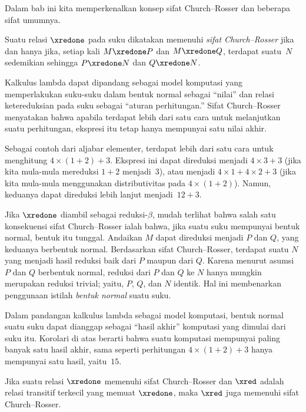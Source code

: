 \documentclass[../../../include/open-logic-section]{subfiles}
\begin{document}


Dalam bab ini kita memperkenalkan konsep sifat Church--Rosser dan beberapa
sifat umumnya.

\begin{defn} Suatu relasi $\xredone$ pada suku
  dikatakan memenuhi \emph{sifat Church--Rosser} jika dan hanya jika, setiap
  kali $M \xredone P$ dan $M \xredone Q$, terdapat suatu~$N$ sedemikian
  sehingga $P \xredone N$ dan $Q \xredone N$.
\end{defn}

Kalkulus lambda dapat dipandang sebagai model komputasi yang memperlakukan
suku-suku dalam bentuk normal sebagai ``nilai'' dan relasi ketereduksian pada
suku sebagai ``aturan perhitungan.'' Sifat Church--Rosser menyatakan bahwa
apabila terdapat lebih dari satu cara untuk melanjutkan suatu perhitungan,
ekspresi itu tetap hanya mempunyai satu nilai akhir.

Sebagai contoh dari aljabar elementer, terdapat lebih dari satu cara untuk
menghitung $4 \times (1+2)+3$. Ekspresi ini dapat direduksi menjadi
$4\times3+3$ (jika kita mula-mula mereduksi $1+2$ menjadi~$3$), atau menjadi
$4\times1+4\times2+3$ (jika kita mula-mula menggunakan distributivitas pada
$4\times(1+2)$). Namun, keduanya dapat direduksi lebih lanjut menjadi~$12+3$.

Jika $\xredone$ diambil sebagai reduksi-$\beta$, mudah terlihat bahwa salah
satu konsekuensi sifat Church--Rosser ialah bahwa, jika suatu suku mempunyai
bentuk normal, bentuk itu tunggal. Andaikan $M$ dapat direduksi menjadi $P$
dan $Q$, yang keduanya berbentuk normal. Berdasarkan sifat Church--Rosser,
terdapat suatu $N$ yang menjadi hasil reduksi baik dari $P$ maupun dari $Q$.
Karena menurut asumsi $P$ dan $Q$ berbentuk normal, reduksi dari $P$ dan $Q$
ke $N$ hanya mungkin merupakan reduksi trivial; yaitu, $P$, $Q$, dan $N$
identik. Hal ini membenarkan penggunaan istilah \emph{bentuk normal} suatu
suku.

Dalam pandangan kalkulus lambda sebagai model komputasi, bentuk normal suatu
suku dapat dianggap sebagai ``hasil akhir'' komputasi yang dimulai dari suku
itu. Korolari di atas berarti bahwa suatu komputasi mempunyai paling banyak
satu hasil akhir, sama seperti perhitungan $4\times(1+2)+3$ hanya mempunyai
satu hasil, yaitu~$15$.

\begin{thm} 
  Jika suatu relasi $\xredone$ memenuhi sifat Church--Rosser dan $\xred$
  adalah relasi transitif terkecil yang memuat $\xredone$, maka $\xred$ juga
  memenuhi sifat Church--Rosser.
\end{thm}
\end{document}
